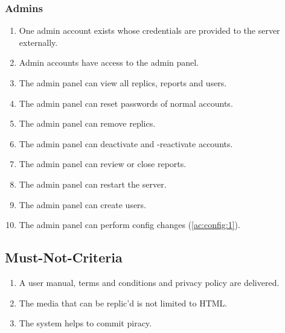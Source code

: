 \subsubsection{Admins}
\begin{enumerate}[label=\textit{AC \arabic*}, resume]
    \item \label{ac:admins:1} One admin account exists whose credentials are provided to the server externally.
    \item \label{ac:admins:2} Admin accounts have access to the admin panel.
    \item \label{ac:admins:3} The admin panel can view all replics, reports and users.
    \item \label{ac:admins:4} The admin panel can reset passwords of normal accounts.
    \item \label{ac:admins:5} The admin panel can remove replics.
    \item \label{ac:admins:6} The admin panel can deactivate and -reactivate accounts.
    \item \label{ac:admins:7} The admin panel can review or close reports.
    \item \label{ac:admins:8} The admin panel can restart the server.
    \item \label{ac:admins:9} The admin panel can create users.
    \item \label{ac:admins:10} The admin panel can perform config changes (\ref{ac:config:1}).
\end{enumerate}

\subsection{Must-Not-Criteria}\label{subsec:must-not-criteria}
\begin{enumerate}[label=\textit{MN \arabic*}]
    \item \label{mnc:1} A user manual, terms and conditions and privacy policy are delivered.
    \item \label{mnc:2} The media that can be replic'd is not limited to HTML\@.
    \item \label{mnc:3} The system helps to commit piracy.
\end{enumerate}